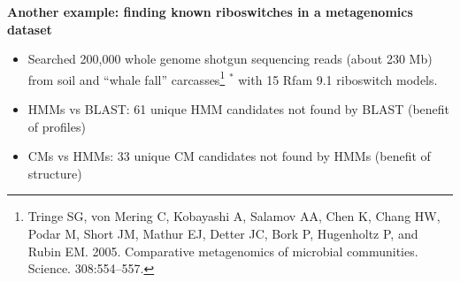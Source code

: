 \documentclass[landscape]{slides}
\begin{document}
\begin{slide}

\begin{center}
\small
\textbf{Another example: finding known riboswitches in a metagenomics dataset}
\end{center}
\medskip

\small
\begin{itemize}
\item Searched 200,000 whole genome shotgun sequencing reads (about 230 Mb) 
  from soil and ``whale fall'' carcasses\footnote{\tiny{
Tringe SG, von Mering C, Kobayashi A, Salamov AA, Chen K,
Chang HW, Podar M, Short JM, Mathur EJ, Detter JC,
Bork P, Hugenholtz P, and Rubin EM. 2005. Comparative
metagenomics of microbial communities. Science. 308:554–557.}}
 $^{*}$ with 15 Rfam 9.1 riboswitch models.

\item HMMs vs BLAST: 61 unique HMM candidates not found by BLAST
  (benefit of profiles)
\item CMs vs HMMs:  33 unique CM candidates not found by HMMs
  (benefit of structure)

\end{itemize}


\vfill 
\end{slide}
\end{document}
